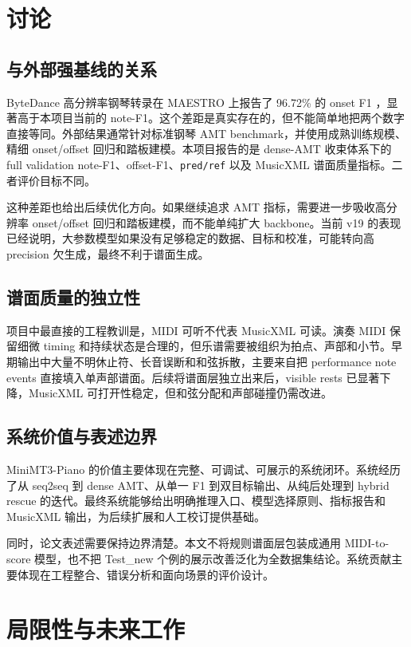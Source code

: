 \documentclass[UTF8,a4paper,zihao=-4]{ctexart}
\newcommand{\code}[1]{\texttt{#1}}
\begin{document}
\section{讨论}

\subsection{与外部强基线的关系}

ByteDance 高分辨率钢琴转录在 MAESTRO 上报告了 96.72\% 的 onset F1 \cite{kong2021highres}，显著高于本项目当前的 note-F1。这个差距是真实存在的，但不能简单地把两个数字直接等同。外部结果通常针对标准钢琴 AMT benchmark，并使用成熟训练规模、精细 onset/offset 回归和踏板建模。本项目报告的是 dense-AMT 收束体系下的 full validation note-F1、offset-F1、\code{pred/ref} 以及 MusicXML 谱面质量指标。二者评价目标不同。

这种差距也给出后续优化方向。如果继续追求 AMT 指标，需要进一步吸收高分辨率 onset/offset 回归和踏板建模，而不能单纯扩大 backbone。当前 v19 的表现已经说明，大参数模型如果没有足够稳定的数据、目标和校准，可能转向高 precision 欠生成，最终不利于谱面生成。

\subsection{谱面质量的独立性}

项目中最直接的工程教训是，MIDI 可听不代表 MusicXML 可读。演奏 MIDI 保留细微 timing 和持续状态是合理的，但乐谱需要被组织为拍点、声部和小节。早期输出中大量不明休止符、长音误断和和弦拆散，主要来自把 performance note events 直接填入单声部谱面。后续将谱面层独立出来后，visible rests 已显著下降，MusicXML 可打开性稳定，但和弦分配和声部碰撞仍需改进。

\subsection{系统价值与表述边界}

MiniMT3-Piano 的价值主要体现在完整、可调试、可展示的系统闭环。系统经历了从 seq2seq 到 dense AMT、从单一 F1 到双目标输出、从纯后处理到 hybrid rescue 的迭代。最终系统能够给出明确推理入口、模型选择原则、指标报告和 MusicXML 输出，为后续扩展和人工校订提供基础。

同时，论文表述需要保持边界清楚。本文不将规则谱面层包装成通用 MIDI-to-score 模型，也不把 Test\_new 个例的展示改善泛化为全数据集结论。系统贡献主要体现在工程整合、错误分析和面向场景的评价设计。

\section{局限性与未来工作}
\end{document}
